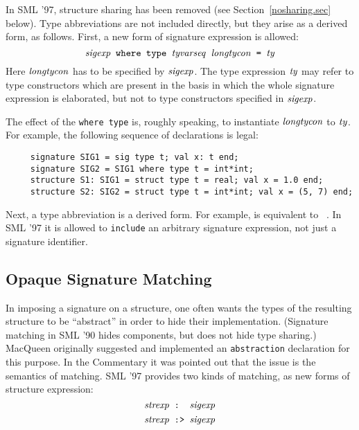 In SML '97, structure sharing has been removed (see Section~\ref{nosharing.sec} below).
Type abbreviations are not included directly, but they arise as a derived form,
as follows.  First, a new form of signature expression is allowed:
$$\hbox{\tt ${\it sigexp}$ where type ${\it tyvarseq}$ ${\it longtycon}$ = ${\it ty}$}$$
Here ${\it longtycon}$ has to be specified by ${\it sigexp}$. The type expression
${\it ty}$ may refer to type constructors which  are 
present in the basis in which the whole signature expression is elaborated, but not
         to type constructors specified in ${\it sigexp}$.


The effect of the {\tt where type} is, roughly speaking, to instantiate ${\it longtycon}$
to ${\it ty}$. For example, the following sequence of declarations is legal:
\begin{verbatim}
     signature SIG1 = sig type t; val x: t end;
     signature SIG2 = SIG1 where type t = int*int;
     structure S1: SIG1 = struct type t = real; val x = 1.0 end;
     structure S2: SIG2 = struct type t = int*int; val x = (5, 7) end;
\end{verbatim}
Next, a  type abbreviation is a derived form. For example, 
 is equivalent to 
~.
In SML '97 it is allowed to \hbox{\tt include} an
arbitrary signature expression, not just a signature identifier.

\subsection{Opaque Signature Matching}
In imposing a signature on a structure, one often wants 
the types of the resulting structure to be ``abstract'' in order to hide
their implementation. (Signature matching in SML '90 
hides components, but does not hide type sharing.)
MacQueen originally suggested and implemented an {\tt abstraction} declaration
for this purpose\cite{mq84}. In the Commentary\cite{mt91} it was
pointed out that the issue is the semantics of matching.
SML '97 provides two 
kinds of matching, as new forms of structure
expression:
$$\strexp\boxml{ : }\sigexp$$
$$\strexp\boxml{ :> }\sigexp$$

